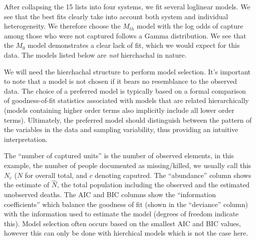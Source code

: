 \documentclass[]{article}
\begin{document}
After collapsing the 15 lists into four systems, we fit several
loglinear models. We see that the best fits clearly take into account
both system and individual heterogeneity. We therefore choose the
\(M_{th}\) model with the log odds of capture among those who were not
captured follows a Gamma distribution. We see that the \(M_0\) model
demonstrates a clear lack of fit, which we would expect for this data.
The models listed below are \emph{not} hierchachal in nature.

We will need the hierchachal structure to perform model selection. It's
important to note that a model is not chosen if it bears no resemblance
to the observed data. The choice of a preferred model is typically based
on a formal comparison of goodness-of-fit statistics associated with
models that are related hierarchically (models containing higher order
terms also implicitly include all lower order terms). Ultimately, the
preferred model should distinguish between the pattern of the variables
in the data and sampling variability, thus providing an intuitive
interpretation.

The ``number of captured units'' is the number of observed elements, in
this example, the number of people documented as missing/killed, we
usually call this \(N_c\) (\(N\) for overall total, and \(c\) denoting
caputred. The ``abundance'' column shows the estimate of \(\hat{N}\),
the total population including the observed and the estimated unobserved
deaths. The AIC and BIC columns show the ``information coefficients''
which balance the goodness of fit (shown in the ``deviance'' column)
with the information used to estimate the model (degrees of freedom
indicate this). Model selection often occurs based on the smallest AIC
and BIC values, however this can only be done with hierchical models
which is not the case here.
\end{document}
